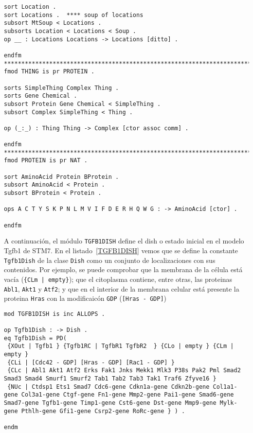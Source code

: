 \begin{lstlisting}[label=THEOPS,language=Maude,caption={Módulo \texttt{THEOPS} y asociados}]
sort Location .
sort Locations .  **** soup of locations
subsort MtSoup < Locations .
subsorts Location < Locations < Soup . 
op __ : Locations Locations -> Locations [ditto] .

endfm
***********************************************************************
fmod THING is pr PROTEIN .

sorts SimpleThing Complex Thing .
sorts Gene Chemical .
subsort Protein Gene Chemical < SimpleThing .
subsort Complex SimpleThing < Thing .

op (_:_) : Thing Thing -> Complex [ctor assoc comm] .           

endfm
***********************************************************************
fmod PROTEIN is pr NAT .

sort AminoAcid Protein BProtein .
subsort AminoAcid < Protein . 
subsort BProtein < Protein .

ops A C T Y S K P N L M V I F D E R H Q W G : -> AminoAcid [ctor] . 
 
endfm 
\end{lstlisting}
\bigskip

A continuación, el módulo \texttt{TGFB1DISH} define el dish o estado inicial en el modelo Tgfb1 de STM7.
En el listado~\ref{TGFB1DISH} vemos que se define la constante \texttt{Tgfb1Dish} de la clase \texttt{Dish} como un conjunto de localizaciones con sus contenidos. Por ejemplo, se puede comprobar que la membrana de la célula está vacía (\verb${CLm | empty}$); que el citoplasma contiene, entre otras, las proteinas \texttt{Abl1}, \texttt{Akt1} y \texttt{Atf2}; y que en el interior de la membrana celular está presente la proteina \texttt{Hras} con la modificaicón \texttt{GDP} (\verb$[Hras - GDP]$)

\begin{lstlisting}[label=TGFB1DISH,language=Maude,caption={Módulo \texttt{TGFB1DISH}}]
mod TGFB1DISH is inc ALLOPS .

op Tgfb1Dish : -> Dish .
eq Tgfb1Dish = PD(    
 {XOut | Tgfb1 } {Tgfb1RC | TgfbR1 TgfbR2  } {CLo | empty } {CLm | empty } 
 {CLi | [Cdc42 - GDP] [Hras - GDP] [Rac1 - GDP] }
 {CLc | Abl1 Akt1 Atf2 Erks Fak1 Jnks Mekk1 Mlk3 P38s Pak2 Pml Smad2 Smad3 Smad4 Smurf1 Smurf2 Tab1 Tab2 Tab3 Tak1 Traf6 Zfyve16 }
 {NUc | Ctdsp1 Ets1 Smad7 Cdc6-gene Cdkn1a-gene Cdkn2b-gene Col1a1-gene Col3a1-gene Ctgf-gene Fn1-gene Mmp2-gene Pai1-gene Smad6-gene Smad7-gene Tgfb1-gene Timp1-gene Cst6-gene Dst-gene Mmp9-gene Mylk-gene Pthlh-gene Gfi1-gene Csrp2-gene RoRc-gene } ) .

endm
\end{lstlisting}
\bigskip


